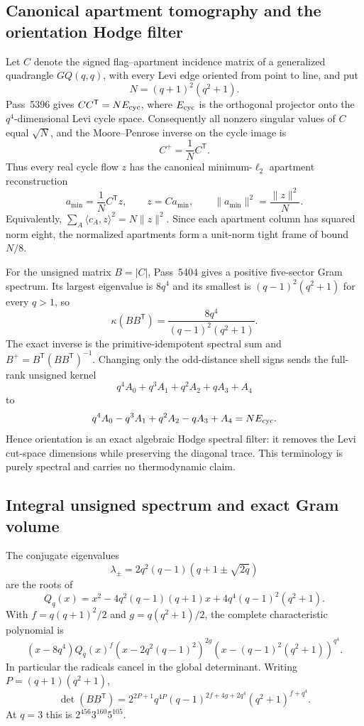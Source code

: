 \subsection{Canonical apartment tomography and the orientation Hodge filter}

Let $C$ denote the signed flag--apartment incidence matrix of a generalized
quadrangle $GQ(q,q)$, with every Levi edge oriented from point to line, and put
\[
 N=(q+1)^2(q^2+1).
\]
Pass~5396 gives $CC^{\mathsf T}=N E_{\rm cyc}$, where $E_{\rm cyc}$ is the
orthogonal projector onto the $q^4$-dimensional Levi cycle space.  Consequently
all nonzero singular values of $C$ equal $\sqrt N$, and the Moore--Penrose inverse
on the cycle image is
\[
 \boxed{C^+=\frac1N C^{\mathsf T}.}
\]
Thus every real cycle flow $z$ has the canonical minimum-$\ell_2$ apartment
reconstruction
\[
 a_{\min}=\frac1N C^{\mathsf T}z,
 \qquad z=Ca_{\min},
 \qquad \|a_{\min}\|^2=\frac{\|z\|^2}{N}.
\]
Equivalently, $\sum_A\langle c_A,z\rangle^2=N\|z\|^2$.  Since each apartment
column has squared norm eight, the normalized apartments form a unit-norm tight
frame of bound $N/8$.

For the unsigned matrix $B=|C|$, Pass~5404 gives a positive five-sector Gram
spectrum.  Its largest eigenvalue is $8q^4$ and its smallest is
$(q-1)^2(q^2+1)$ for every $q>1$, so
\[
 \boxed{\kappa(BB^{\mathsf T})=\frac{8q^4}{(q-1)^2(q^2+1)}.}
\]
The exact inverse is the primitive-idempotent spectral sum and
$B^+=B^{\mathsf T}(BB^{\mathsf T})^{-1}$.  Changing only the odd-distance shell
signs sends the full-rank unsigned kernel
\[
 q^4A_0+q^3A_1+q^2A_2+qA_3+A_4
\]
to
\[
 q^4A_0-q^3A_1+q^2A_2-qA_3+A_4=N E_{\rm cyc}.
\]
Hence orientation is an exact algebraic Hodge spectral filter: it removes the
Levi cut-space dimensions while preserving the diagonal trace.  This terminology
is purely spectral and carries no thermodynamic claim.

\subsection{Integral unsigned spectrum and exact Gram volume}

The conjugate eigenvalues
\[
 \lambda_{\pm}=2q^2(q-1)(q+1\pm\sqrt{2q})
\]
are the roots of
\[
 Q_q(x)=x^2-4q^2(q-1)(q+1)x+4q^4(q-1)^2(q^2+1).
\]
With $f=q(q+1)^2/2$ and $g=q(q^2+1)/2$, the complete characteristic polynomial is
\[
 \boxed{(x-8q^4)Q_q(x)^f(x-2q^2(q-1)^2)^{2g}(x-(q-1)^2(q^2+1))^{q^4}.}
\]
In particular the radicals cancel in the global determinant.  Writing
$P=(q+1)(q^2+1)$,
\[
 \boxed{\det(BB^{\mathsf T})=
 2^{2P+1}q^{4P}(q-1)^{2f+4g+2q^4}(q^2+1)^{f+q^4}.}
\]
At $q=3$ this is $2^{456}3^{160}5^{105}$.

